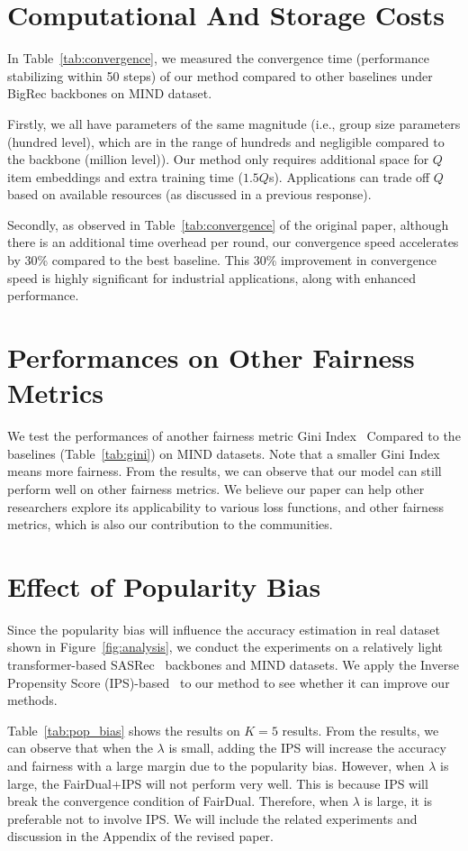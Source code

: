 \section{Computational And Storage Costs}\label{app:computational}

In Table~\ref{tab:convergence}, we measured the convergence time (performance stabilizing within 50 steps) of our method compared to other baselines under BigRec backbones on MIND dataset.

Firstly, we all have parameters of the same magnitude (i.e., group size parameters (hundred level), which are in the range of hundreds and negligible compared to the backbone (million level)). 
Our method only requires additional space for $Q$ item embeddings and extra training time ($1.5Q$s). Applications can trade off $Q$ based on available resources (as discussed in a previous response).

Secondly, as observed in Table~\ref{tab:convergence} of the original paper, although there is an additional time overhead per round, our convergence speed accelerates by 30\% compared to the best baseline. This 30\% improvement in convergence speed is highly significant for industrial applications, along with enhanced performance.

\section{Performances on Other Fairness Metrics}\label{app:GINI}

We test the performances of another fairness metric Gini Index~\citep{do2022optimizing} Compared to the baselines (Table~\ref{tab:gini}) on MIND datasets. Note that a smaller Gini Index means more fairness. From the results, we can observe that our model can still perform well on other fairness metrics. We believe our paper can help other researchers explore its applicability to various loss functions, and other fairness metrics, which is also our contribution to the communities.


\section{Effect of Popularity Bias}\label{app:pop_bias}
Since the popularity bias will influence the accuracy estimation in real dataset shown in Figure~\ref{fig:analysis}, we conduct the experiments on a relatively light transformer-based SASRec~\citep{SASRec} backbones and MIND datasets. We apply the Inverse Propensity Score (IPS)-based~\cite{xu2022dually} to our method to see whether it can improve our methods.


Table~\ref{tab:pop_bias} shows the results on $K=5$ results. From the results, we can observe that when the $\lambda$ is small, adding the IPS will increase the accuracy and fairness with a large margin due to the popularity bias. However, when $\lambda$ is large, the FairDual+IPS will not perform very well. This is because IPS will break the convergence condition of FairDual. Therefore, when $\lambda$ is large, it is preferable not to involve IPS. We will include the related experiments and discussion in the Appendix of the revised paper.



